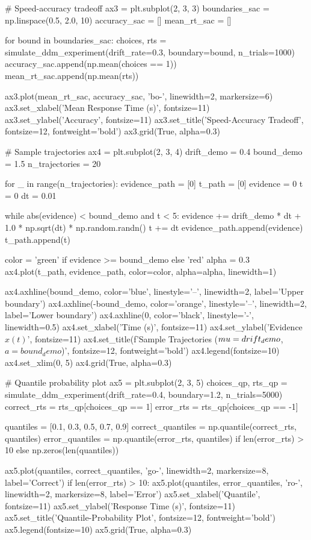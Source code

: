 \documentclass[a4paper, 11pt]{article}
\begin{document}
\begin{pycode}
# Speed-accuracy tradeoff
ax3 = plt.subplot(2, 3, 3)
boundaries_sac = np.linspace(0.5, 2.0, 10)
accuracy_sac = []
mean_rt_sac = []

for bound in boundaries_sac:
    choices, rts = simulate_ddm_experiment(drift_rate=0.3, boundary=bound, n_trials=1000)
    accuracy_sac.append(np.mean(choices == 1))
    mean_rt_sac.append(np.mean(rts))

ax3.plot(mean_rt_sac, accuracy_sac, 'bo-', linewidth=2, markersize=6)
ax3.set_xlabel('Mean Response Time (s)', fontsize=11)
ax3.set_ylabel('Accuracy', fontsize=11)
ax3.set_title('Speed-Accuracy Tradeoff', fontsize=12, fontweight='bold')
ax3.grid(True, alpha=0.3)

# Sample trajectories
ax4 = plt.subplot(2, 3, 4)
drift_demo = 0.4
bound_demo = 1.5
n_trajectories = 20

for _ in range(n_trajectories):
    evidence_path = [0]
    t_path = [0]
    evidence = 0
    t = 0
    dt = 0.01

    while abs(evidence) < bound_demo and t < 5:
        evidence += drift_demo * dt + 1.0 * np.sqrt(dt) * np.random.randn()
        t += dt
        evidence_path.append(evidence)
        t_path.append(t)

    color = 'green' if evidence >= bound_demo else 'red'
    alpha = 0.3
    ax4.plot(t_path, evidence_path, color=color, alpha=alpha, linewidth=1)

ax4.axhline(bound_demo, color='blue', linestyle='--', linewidth=2, label='Upper boundary')
ax4.axhline(-bound_demo, color='orange', linestyle='--', linewidth=2, label='Lower boundary')
ax4.axhline(0, color='black', linestyle='-', linewidth=0.5)
ax4.set_xlabel('Time (s)', fontsize=11)
ax4.set_ylabel('Evidence $x(t)$', fontsize=11)
ax4.set_title(f'Sample Trajectories ($\\mu={drift_demo}$, $a={bound_demo}$)', fontsize=12, fontweight='bold')
ax4.legend(fontsize=10)
ax4.set_xlim(0, 5)
ax4.grid(True, alpha=0.3)

# Quantile probability plot
ax5 = plt.subplot(2, 3, 5)
choices_qp, rts_qp = simulate_ddm_experiment(drift_rate=0.4, boundary=1.2, n_trials=5000)
correct_rts = rts_qp[choices_qp == 1]
error_rts = rts_qp[choices_qp == -1]

quantiles = [0.1, 0.3, 0.5, 0.7, 0.9]
correct_quantiles = np.quantile(correct_rts, quantiles)
error_quantiles = np.quantile(error_rts, quantiles) if len(error_rts) > 10 else np.zeros(len(quantiles))

ax5.plot(quantiles, correct_quantiles, 'go-', linewidth=2, markersize=8, label='Correct')
if len(error_rts) > 10:
    ax5.plot(quantiles, error_quantiles, 'ro-', linewidth=2, markersize=8, label='Error')
ax5.set_xlabel('Quantile', fontsize=11)
ax5.set_ylabel('Response Time (s)', fontsize=11)
ax5.set_title('Quantile-Probability Plot', fontsize=12, fontweight='bold')
ax5.legend(fontsize=10)
ax5.grid(True, alpha=0.3)


\end{pycode}
\end{document}
